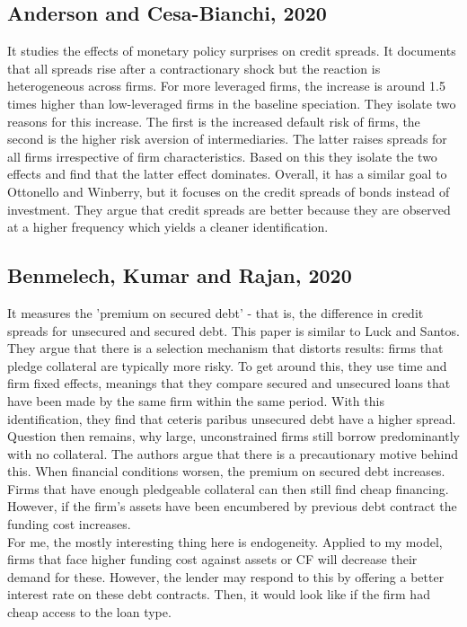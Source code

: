 \documentclass[12pt]{article}
\begin{document}
\subsection*{Anderson and Cesa-Bianchi, 2020}
It studies the effects of monetary policy surprises on credit spreads. It documents that all spreads rise after a contractionary shock but the reaction is heterogeneous across firms. For more leveraged firms, the increase is around 1.5 times higher than low-leveraged firms in the baseline speciation. They isolate two reasons for this increase. The first is the increased default risk of firms, the second is the higher risk aversion of intermediaries. The latter raises spreads for all firms irrespective of firm characteristics. Based on this they isolate the two effects and find that the latter effect dominates. Overall, it has a similar goal to Ottonello and Winberry, but it focuses on the credit spreads of bonds instead of investment. They argue that credit spreads are better because they are observed at a higher frequency which yields a cleaner identification. 

\subsection*{Benmelech, Kumar and Rajan, 2020}
It measures the 'premium on secured debt' - that is, the difference in credit spreads for unsecured and secured debt. This paper is similar to Luck and Santos. They argue that there is a selection mechanism that distorts results: firms that pledge collateral are typically more risky. To get around this, they use time and firm fixed effects, meanings that they compare secured and unsecured loans that have been made by the same firm within the same period. With this identification, they find that ceteris paribus unsecured debt have a higher spread. Question then remains, why large, unconstrained firms still borrow predominantly with no collateral. The authors argue that there is a precautionary motive behind this. When financial conditions worsen, the premium on secured debt increases. Firms that have enough pledgeable collateral can then still find cheap financing. However, if the firm's assets have been encumbered by previous debt contract the funding cost increases. \\
For me, the mostly interesting thing here is endogeneity. Applied to my model, firms that face higher funding cost against assets or CF will decrease their demand for these. However, the lender may respond to this by offering a better interest rate on these debt contracts. Then, it would look like if the firm had cheap access to the loan type. 
\end{document}
